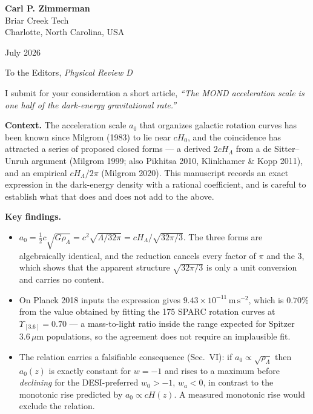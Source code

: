 \documentclass[11pt]{article}
\begin{document}
\noindent
{\large\textbf{Carl P. Zimmerman}}\\
Briar Creek Tech\\
Charlotte, North Carolina, USA

\vspace{0.6em}
\noindent\hrulefill

\vspace{0.8em}
 July 2026

\vspace{1.2em}
\noindent To the Editors, \textit{Physical Review D}

\vspace{0.6em}
\noindent
I submit for your consideration a short article, \textit{``The MOND acceleration scale is one half of the
dark-energy gravitational rate.''}

\vspace{0.6em}
\noindent\textbf{Context.}
The acceleration scale $a_0$ that organizes galactic rotation curves has been known since Milgrom (1983)
to lie near $cH_0$, and the coincidence has attracted a series of proposed closed forms --- a derived
$2cH_\Lambda$ from a de Sitter--Unruh argument (Milgrom 1999; also Pikhitsa 2010, Klinkhamer \& Kopp
2011), and an empirical $cH_\Lambda/2\pi$ (Milgrom 2020). This manuscript records an exact expression in
the dark-energy density with a rational coefficient, and is careful to establish what that does and does
not add to the above.

\vspace{0.6em}
\noindent\textbf{Key findings.}
\begin{itemize}
\item $a_0 = \tfrac12 c\sqrt{G\rho_\Lambda} = c^2\sqrt{\Lambda/32\pi} = cH_\Lambda/\sqrt{32\pi/3}$. The
three forms are algebraically identical, and the reduction cancels every factor of $\pi$ and the 3, which
shows that the apparent structure $\sqrt{32\pi/3}$ is only a unit conversion and carries no content.
\item On Planck 2018 inputs the expression gives $9.43\times10^{-11}\,\mathrm{m\,s^{-2}}$, which is
$0.70\%$ from the value obtained by fitting the 175 SPARC rotation curves at $\Upsilon_{[3.6]} = 0.70$ ---
a mass-to-light ratio inside the range expected for Spitzer $3.6\,\mu$m populations, so the agreement does
not require an implausible fit.
\item The relation carries a falsifiable consequence (Sec.~VI): if $a_0\propto\sqrt{\rho_\Lambda}$ then
$a_0(z)$ is exactly constant for $w=-1$ and rises to a maximum before \emph{declining} for the
DESI-preferred $w_0>-1$, $w_a<0$, in contrast to the monotonic rise predicted by $a_0\propto cH(z)$. A
measured monotonic rise would exclude the relation.
\end{itemize}
\end{document}
